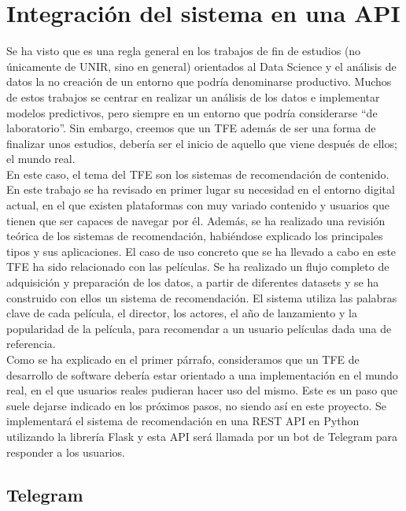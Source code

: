 \chapter{Integración del sistema en una API}\label{chap:api}

Se ha visto que es una regla general en los trabajos de fin de estudios (no únicamente de UNIR, sino en general) orientados al Data Science y el análisis de datos la no creación de un entorno que podría denominarse productivo. Muchos de estos trabajos se centrar en realizar un análisis de los datos e implementar modelos predictivos, pero siempre en un entorno que podría considerarse ``de laboratorio''. Sin embargo, creemos que un TFE además de ser una forma de finalizar unos estudios, debería ser el inicio de aquello que viene después de ellos; el mundo real.\\

En este caso, el tema del TFE son los sistemas de recomendación de contenido. En este trabajo se ha revisado en primer lugar su necesidad en el entorno digital actual, en el que existen plataformas con muy variado contenido y usuarios que tienen que ser capaces de navegar por él. Además, se ha realizado una revisión teórica de los sistemas de recomendación, habiéndose explicado los principales tipos y sus aplicaciones. El caso de uso concreto que se ha llevado a cabo en este TFE ha sido relacionado con las películas. Se ha realizado un flujo completo de adquisición y preparación de los datos, a partir de diferentes datasets y se ha construido con ellos un sistema de recomendación. El sistema utiliza las palabras clave de cada película, el director, los actores, el año de lanzamiento y la popularidad de la película, para recomendar a un usuario películas dada una de referencia.\\

Como se ha explicado en el primer párrafo, consideramos que un TFE de desarrollo de software debería estar orientado a una implementación en el mundo real, en el que usuarios reales pudieran hacer uso del mismo. Este es un paso que suele dejarse indicado en los próximos pasos, no siendo así en este proyecto. Se implementará el sistema de recomendación en una REST API en Python utilizando la librería Flask y esta API será llamada por un bot de Telegram para responder a los usuarios.

\section{Telegram}

